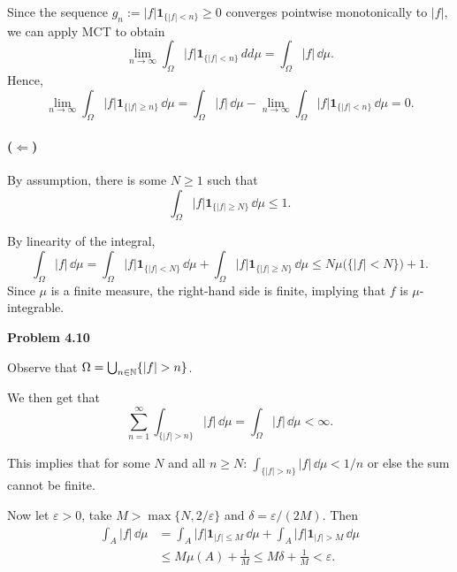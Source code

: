 Since the sequence $g_n:= |f|\mathbf{1}_{\{|f|< n\}}\ge 0$ converges pointwise monotonically to $|f|$, we can apply MCT to obtain
\[
	\lim_{n\to\infty} \int_\Omega |f|\mathbf{1}_{\{|f|< n\}}\,dd\mu = \int_\Omega |f|\,\dd\mu.
\]
Hence,
\[	
	\lim_{n\to\infty}\int_\Omega |f|\mathbf{1}_{\{|f|\ge n\}}\,\dd\mu = \int_\Omega |f|\,\dd\mu - \lim_{n\to\infty}\int_\Omega |f|\mathbf{1}_{\{|f|< n\}}\,\dd\mu = 0.
\]

\paragraph{($\Leftarrow$)} %

By assumption, there is some $N\ge 1$ such that
\[
	\int_\Omega |f|\mathbf{1}_{\{|f|\ge N\}}\,\dd\mu \le 1.
\]

By linearity of the integral,
\[
	\int_\Omega |f|\,\dd\mu = \int_\Omega |f|\mathbf{1}_{\{|f|< N\}}\,\dd\mu +\int_\Omega |f|\mathbf{1}_{\{|f|\ge N\}}\,\dd\mu \le N \mu\bigl(\{|f|< N\}\bigr) + 1.
\]
Since $\mu$ is a finite measure, the right-hand side is finite, implying that $f$ is $\mu$-integrable.

\bigskip
\textbf{Problem 4.10}

Observe that $\Omega = \bigcup_{n \in \mathbb N} \{|f| > n\}$. 

We then get that
\[
	\sum_{n = 1}^\infty \int_{\{|f| > n\}} |f| \, \dd \mu = \int_\Omega |f| \, \dd \mu < \infty.
\]

This implies that for some $N$ and all $n \ge N$: $\int_{\{|f| > n\}} |f| \, \dd \mu < 1/n$ or else the sum cannot be finite.

Now let $\varepsilon > 0$, take $M > \max\{N, 2/\varepsilon\}$ and $\delta = \varepsilon/(2M)$. Then
\begin{align*}
	\int_A |f| \, \dd \mu &= \int_A |f| \mathbf{1}_{|f|\le M} \, \dd \mu + \int_A |f| \mathbf{1}_{|f|> M} \, \dd \mu\\
	&\le M \mu(A) + \frac{1}{M} \le M\delta + \frac{1}{M} < \varepsilon.
\end{align*}

